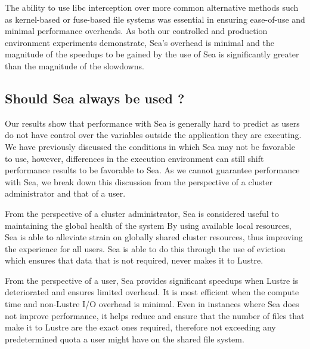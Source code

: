     The ability to use libc interception over more common alternative methods
    such as kernel-based or fuse-based file systems was essential in ensuring
    ease-of-use and minimal performance overheads. As both our controlled and production
    environment experiments demonstrate, Sea's overhead is minimal and the magnitude of the
    speedups to be gained by the use of Sea is significantly greater than the magnitude of the
    slowdowns.
    
    \subsection{Should Sea always be used ?}
    
    Our results show that performance with Sea is generally hard to predict as users do not have control
    over the variables outside the application they are executing. We have previously discussed the
    conditions in which Sea may not be favorable to use, however, differences in the execution environment
    can still shift performance results to be favorable to Sea. As we cannot guarantee performance with
    Sea, we break down this discussion from the perspective of a cluster administrator and that of a user.

    From the perspective of a cluster administrator, Sea is considered useful to
    maintaining the global health of the system By using available local
    resources, Sea is able to alleviate strain on globally shared cluster
    resources, thus improving the experience for all users. Sea is able to do
    this through the use of eviction which ensures that data that is not
    required, never makes it to Lustre.


    From the perspective of a user, Sea provides significant speedups when
    Lustre is deteriorated and ensures limited overhead. It is most efficient
    when the compute time and non-Lustre I/O overhead is minimal. Even in
    instances where Sea does not improve performance, it helps reduce and ensure
    that the number of files that make it to Lustre are the exact ones required,
    therefore not exceeding any predetermined quota a user might have on the
    shared file system. 
    
    
    
    
    
    
